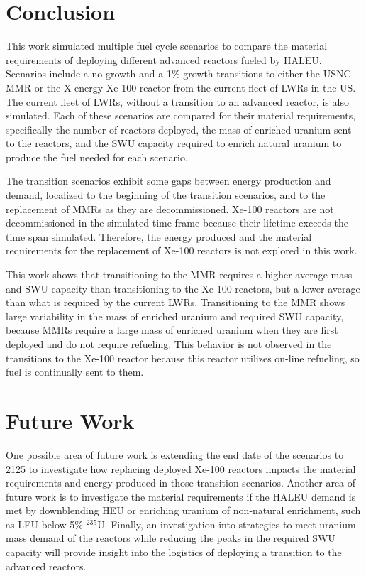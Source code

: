 \section{Conclusion}
This work simulated multiple fuel cycle scenarios to compare the 
material requirements of deploying different advanced reactors fueled 
by \gls{HALEU}. Scenarios include a no-growth and a 1\% growth 
transitions to either the \gls{USNC} \gls{MMR} or the X-energy Xe-100 
reactor from the current fleet of \glspl{LWR} in the US. The current 
fleet of \glspl{LWR}, without a transition to an advanced reactor, is 
also simulated. Each of these scenarios are compared for their material 
requirements, specifically the number of reactors deployed, the mass 
of enriched uranium sent to the reactors, and the \gls{SWU} capacity 
required to enrich natural uranium to produce the fuel needed for 
each scenario. 

The transition scenarios exhibit some gaps between  
energy production and demand, localized to the beginning of the 
transition
scenarios, and to the replacement of \glspl{MMR} as they are decommissioned. 
Xe-100 reactors are not decommissioned in the simulated time frame because 
their lifetime exceeds the time span simulated. Therefore, the 
energy produced and the material requirements for the replacement of 
Xe-100 reactors is not explored in this work. 

This work shows that transitioning to the \gls{MMR} requires 
a higher average mass and \gls{SWU} capacity than transitioning to the 
Xe-100 reactors, but a lower average than what is required by the current 
\glspl{LWR}. Transitioning to the \gls{MMR} shows large variability in 
the mass of enriched uranium and required \gls{SWU} capacity, because 
\glspl{MMR} require a large mass of enriched uranium when they are 
first deployed and do not require refueling. This behavior is not observed 
in the transitions to the Xe-100 reactor because this reactor utilizes 
on-line refueling, so fuel is continually sent to them. 

\section{Future Work}
One possible area of future work is extending the end date 
of the scenarios to 2125 to investigate how replacing deployed Xe-100 
reactors impacts the material requirements and energy produced in those 
transition scenarios. Another area of future work is to investigate the 
material requirements if the \gls{HALEU} demand is met by downblending 
\gls{HEU} or enriching uranium of non-natural enrichment, such as 
\gls{LEU} below 5\% $^{235}$U. Finally, an investigation into strategies 
to meet uranium mass demand of the reactors while reducing the peaks in 
the required \gls{SWU} capacity will provide insight into the logistics 
of deploying a transition to the advanced reactors.
